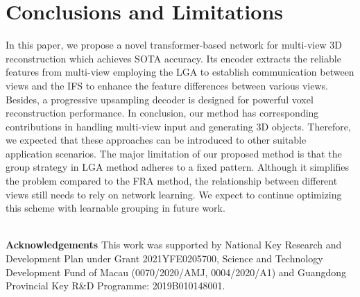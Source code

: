 \documentclass[10pt,twocolumn,letterpaper]{article}
\begin{document}
\section{Conclusions and Limitations}

In this paper, we propose a novel transformer-based network for multi-view 3D reconstruction which achieves SOTA accuracy. Its encoder extracts the reliable features from multi-view employing the LGA to establish communication between views and the IFS to enhance the feature differences between various views. Besides, a progressive upsampling decoder is designed for powerful voxel reconstruction performance. In conclusion, our method has corresponding contributions in handling multi-view input and generating 3D objects. Therefore, we expected that these approaches can be introduced to other suitable application scenarios. The major limitation of our proposed method is that the group strategy in LGA method adheres to a fixed pattern. Although it simplifies the problem compared to the FRA method, the relationship between different views still needs to rely on network learning. We expect to continue optimizing this scheme with learnable grouping in future work.

~\\
\setlength{\parindent}{0pt} { \textbf{Acknowledgements} This work was supported by National Key Research and Development Plan under Grant 2021YFE0205700, Science and Technology Development Fund of Macau (0070/2020/AMJ, 0004/2020/A1) and Guangdong Provincial Key R\&D Programme: 2019B010148001.
}
{\small


}
\end{document}

